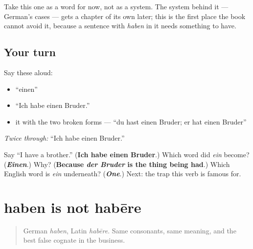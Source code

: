 Take this one as a word for now, not as a system. The system behind it — German's cases — gets a chapter of its own later; this is the first place the book cannot avoid it, because a sentence with \emph{haben} in it needs something to have.

\subsection*{Your turn}
Say these aloud:

\begin{itemize}
\raggedright
  \item \textquotedblleft{}einen\textquotedblright{}
  \item \textquotedblleft{}Ich habe einen Bruder.\textquotedblright{}
  \item it with the two broken forms — \textquotedblleft{}du hast einen Bruder; er hat einen Bruder\textquotedblright{}
\end{itemize}

\emph{Twice through:} \textquotedblleft{}Ich habe einen Bruder.\textquotedblright{}

\begin{tcolorbox}[breakable,colback=teal!4,colframe=teal!35!black,title={Before you move on}]
Say \textquotedblleft{}I have a brother.\textquotedblright{} (\textbf{Ich habe einen Bruder}.) Which word did \emph{ein} become? (\emph{\textbf{Einen}}.) Why? (\textbf{Because \emph{der Bruder} is the thing being had}.) Which English word is \emph{ein} underneath? (\emph{\textbf{One}}.) Next: the trap this verb is famous for.
\end{tcolorbox}
\section[haben ist nicht habēre]{haben is not habēre}

\label{lesson:GE-C14-habere}



\begin{quote}
German \emph{haben}, Latin \emph{habēre}. Same consonants, same meaning, and the best false cognate in the business.
\end{quote}

